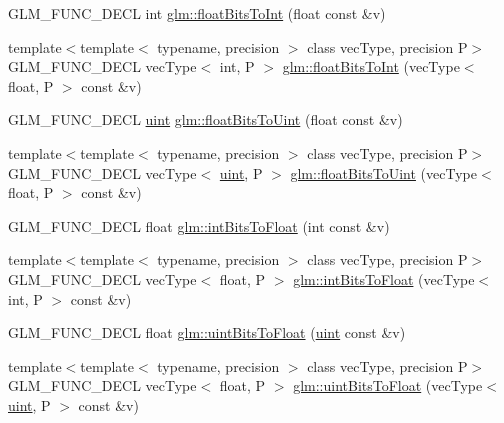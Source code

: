 \begin{DoxyCompactItemize}
G\+L\+M\+\_\+\+F\+U\+N\+C\+\_\+\+D\+E\+CL int \hyperlink{group__core__func__common_gadc6a536a7bef046c3293d2ccad6d9ca2}{glm\+::float\+Bits\+To\+Int} (float const \&v)
\item 
{\footnotesize template$<$template$<$ typename, precision $>$ class vec\+Type, precision P$>$ }\\G\+L\+M\+\_\+\+F\+U\+N\+C\+\_\+\+D\+E\+CL vec\+Type$<$ int, P $>$ \hyperlink{group__core__func__common_gac4a0710238ae54c67931dd29a0b0f873}{glm\+::float\+Bits\+To\+Int} (vec\+Type$<$ float, P $>$ const \&v)
\item 
G\+L\+M\+\_\+\+F\+U\+N\+C\+\_\+\+D\+E\+CL \hyperlink{group__core__precision_ga4fd29415871152bfb5abd588334147c8}{uint} \hyperlink{group__core__func__common_ga748b4d2819b48d28ca09dc8733488873}{glm\+::float\+Bits\+To\+Uint} (float const \&v)
\item 
{\footnotesize template$<$template$<$ typename, precision $>$ class vec\+Type, precision P$>$ }\\G\+L\+M\+\_\+\+F\+U\+N\+C\+\_\+\+D\+E\+CL vec\+Type$<$ \hyperlink{group__core__precision_ga4fd29415871152bfb5abd588334147c8}{uint}, P $>$ \hyperlink{group__core__func__common_ga1804d4c443605d8a27be644aa461afe4}{glm\+::float\+Bits\+To\+Uint} (vec\+Type$<$ float, P $>$ const \&v)
\item 
G\+L\+M\+\_\+\+F\+U\+N\+C\+\_\+\+D\+E\+CL float \hyperlink{group__core__func__common_ga2650dc57b2148a6ffbce20944fb4d97a}{glm\+::int\+Bits\+To\+Float} (int const \&v)
\item 
{\footnotesize template$<$template$<$ typename, precision $>$ class vec\+Type, precision P$>$ }\\G\+L\+M\+\_\+\+F\+U\+N\+C\+\_\+\+D\+E\+CL vec\+Type$<$ float, P $>$ \hyperlink{group__core__func__common_gad21ab176dd0e6b59d923db5efca87f4e}{glm\+::int\+Bits\+To\+Float} (vec\+Type$<$ int, P $>$ const \&v)
\item 
G\+L\+M\+\_\+\+F\+U\+N\+C\+\_\+\+D\+E\+CL float \hyperlink{group__core__func__common_ga97464ca9ff4267de30ea408f700d4ca8}{glm\+::uint\+Bits\+To\+Float} (\hyperlink{group__core__precision_ga4fd29415871152bfb5abd588334147c8}{uint} const \&v)
\item 
{\footnotesize template$<$template$<$ typename, precision $>$ class vec\+Type, precision P$>$ }\\G\+L\+M\+\_\+\+F\+U\+N\+C\+\_\+\+D\+E\+CL vec\+Type$<$ float, P $>$ \hyperlink{group__core__func__common_ga3acab37650ecd792dc84548094b58684}{glm\+::uint\+Bits\+To\+Float} (vec\+Type$<$ \hyperlink{group__core__precision_ga4fd29415871152bfb5abd588334147c8}{uint}, P $>$ const \&v)

\end{DoxyCompactItemize}
